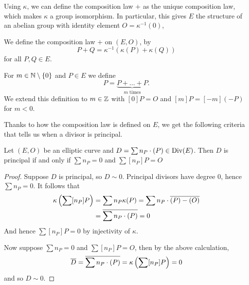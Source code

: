 
Using $\kappa$, we can define the composition law $+$ as the unique
composition law, which makes $\kappa$ a group isomorphism.
In particular, this gives $E$ the structure of an abelian group
with identity element $O = \kappa^{-1}(0)$,
\begin{definition}
	We define the composition law $+$ on $(E, O)$, by 
	\begin{equation*}
		P + Q = \kappa^{-1}(\kappa(P) + \kappa(Q))
	\end{equation*}
	for all $P, Q \in E$.
\end{definition}

\begin{notation}
	For $m \in \mathbb{N}\setminus\{0\}$ and $P \in E$ we define
	\begin{equation*}
		[m]P = \underbrace{P + \dots + P}_{m\textrm{ times}}.
	\end{equation*}
	We extend this definition to $m \in \mathbb{Z}$ with $[0]P = O$ and
	$[m]P = [-m](-P)$ for $m < 0$.
\end{notation}


Thanks to how the composition law is defined on $E$, we get the following
criteria that tells us when a divisor is principal.
\begin{proposition}
	\label{prop:div-principal}
	Let $(E, O)$ be an elliptic curve and $D = \sum n_P \cdot (P) \in \operatorname{Div}(E)$.
	Then $D$ is principal if and only if $\sum n_P = 0$ and $\sum [n_P]P = O$
\end{proposition}

\begin{proof}
	Suppose $D$ is principal, so $D\sim 0$. 
	Principal divisors have degree $0$,
	hence $\sum n_P = 0$. It follows that
	\begin{align*}
		\kappa\left(\sum [n_P]P\right) &= \sum n_P\kappa(P) = \sum n_P
		\cdot\overline{(P) - (O)}\\
		&= \overline{\sum n_P\cdot(P)} = 0
	\end{align*}
	And hence $\sum [n_P]P = 0$ by injectivity of $\kappa$.

	Now suppose $\sum n_P = 0$ and $\sum [n_P] P = O$,
	then by the above calculation,
	\begin{equation*}
		\overline{D} = \overline{\sum n_P\cdot(P)} = \kappa\left(\sum [n_P] P\right) = 0
	\end{equation*}
	and so $D \sim 0$.
\end{proof}

